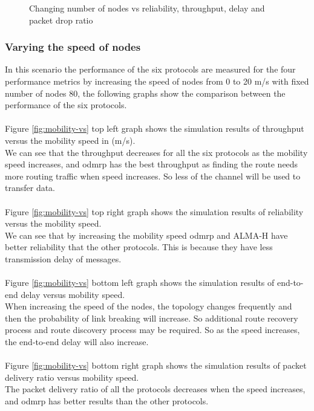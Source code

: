 \begin{figure}[!htbp]
    \caption{Changing number of nodes vs reliability, throughput, delay and packet drop ratio}
    \label{fig:nodes-vs}
\end{figure}

\subsubsection{Varying the speed of nodes}

In this scenario the performance of the six protocols are measured for the four performance metrics by increasing the speed of nodes from 0 to 20 m/s with fixed number of nodes 80, the following graphs show the comparison between the performance of the six protocols.
\\
\\
Figure \ref{fig:mobility-vs} top left graph shows the simulation results of throughput versus the mobility speed in (m/s).
\\
We can see that the throughput decreases for all the six protocols as the mobility speed increases, and \acrshort{odmrp} has the best throughput as finding the route needs more routing traffic when speed increases. So less of the channel will be used to transfer data.
\\
\\
Figure \ref{fig:mobility-vs} top right graph shows the simulation results of reliability versus the mobility speed.
\\
We can see that by increasing the mobility speed \acrshort{odmrp} and ALMA-H have better reliability that the other protocols. This is because they have less transmission delay of messages.
\\
\\
Figure \ref{fig:mobility-vs} bottom left graph shows the simulation results of end-to-end delay versus mobility speed.
\\
When increasing the speed of the nodes, the topology changes frequently and then the probability of link breaking will increase. So additional route recovery process and route discovery process may be required. So as the speed increases, the end-to-end delay will also increase.
\\
\\
Figure \ref{fig:mobility-vs} bottom right graph shows the simulation results of packet delivery ratio versus mobility speed.
\\
The packet delivery ratio of all the protocols decreases when the speed increases, and \acrshort{odmrp} has better results than the other protocols.

